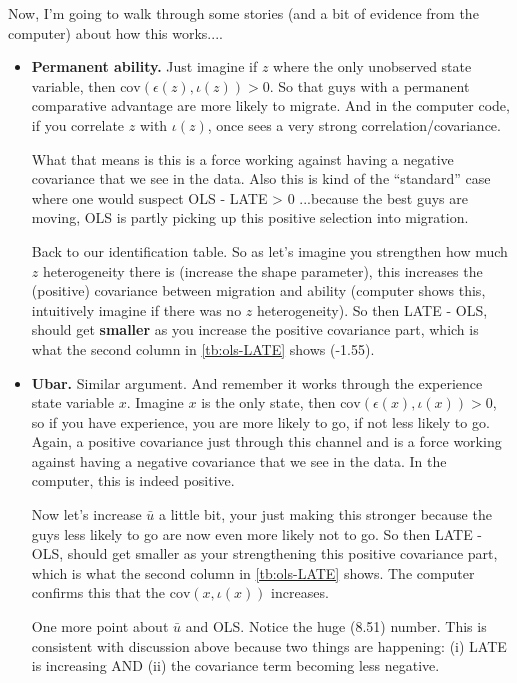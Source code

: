 \documentclass[pdftex,11pt]{article}
\begin{document}
Now, I'm going to walk through some stories (and a bit of evidence from the computer) about how this works.... 
\begin{itemize}
\item \textbf{Permanent ability.} Just imagine if $z$ where the only unobserved state variable, then  $\mathrm{cov}( \epsilon(z), \iota(z)) > 0$. So that guys with a permanent comparative advantage are more likely to migrate. And in the computer code, if you correlate $z$ with $\iota(z)$, once sees a very strong correlation/covariance. 
    
    What that means is this is a force working against having a negative covariance that we see in the data. Also this is kind of the ``standard'' case where one would suspect OLS - LATE > 0 ...because the best guys are moving, OLS is partly picking up this positive selection into migration. 
    
    Back to our identification table. So as let's imagine you strengthen how much $z$ heterogeneity there is (increase the shape parameter), this increases the (positive) covariance between migration and ability (computer shows this, intuitively imagine if there was no $z$ heterogeneity). So then LATE - OLS, should get \textbf{smaller} as you increase the positive covariance part, which is what the second column in \ref{tb:ols-LATE} shows (-1.55).

\item \textbf{Ubar.} Similar argument. And remember it works through the experience state variable $x$.  Imagine $x$ is the only state, then $\mathrm{cov}( \epsilon(x), \iota(x)) > 0 $, so if you have experience, you are more likely to go, if not less likely to go. Again, a positive covariance just through this channel and is a force working against having a negative covariance that we see in the data. In the computer, this is indeed positive. 
    
    Now let's increase $\bar u$ a little bit, your just making this stronger because the guys less likely to go are now even more likely not to go. So then LATE - OLS, should get smaller as your strengthening this positive covariance part, which is what the second column in \ref{tb:ols-LATE} shows. The computer confirms this that the $\mathrm{cov}(x, \iota(x))$ increases. 

    One more point about $\bar u$ and OLS. Notice the huge (8.51) number. This is consistent with discussion above because two things are happening: (i) LATE is increasing AND (ii) the covariance term becoming less negative.
\end{itemize}
\end{document}

